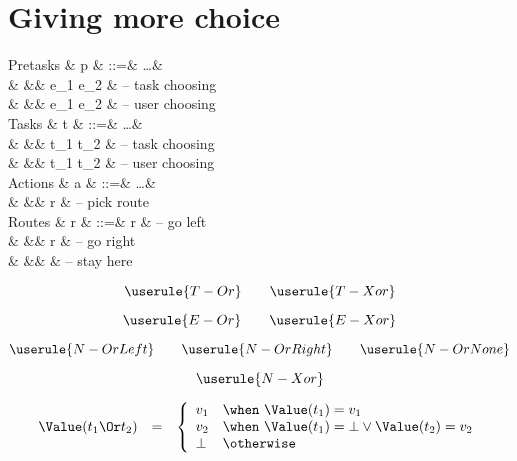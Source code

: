 
\section{Giving more choice}

\begin{grammar}
  Pretasks
    & p & ::=& \ldots       & \\
    &   &\mid& e_1 \Or e_2  & – task choosing \\
    &   &\mid& e_1 \Xor e_2 & – user choosing \\
  Tasks
    & t & ::=& \ldots       & \\
    &   &\mid& t_1 \Or t_2  & – task choosing \\
    &   &\mid& t_1 \Xor t_2 & – user choosing \\
  Actions
    & a & ::=& \ldots       & \\
    &   &\mid& \Pick r      & – pick route \\
  Routes
    & r & ::=& \Left r      & – go left \\
    &   &\mid& \Right r     & – go right \\
    &   &\mid& \Here        & – stay here \\
\end{grammar}

\begin{equation*}
  \userule{T-Or} \qquad \userule{T-Xor}
\end{equation*}

\begin{equation*}
  \userule{E-Or} \qquad \userule{E-Xor}
\end{equation*}

\begin{equation*}
  \userule{N-OrLeft} \qquad \userule{N-OrRight} \qquad \userule{N-OrNone}
\end{equation*}

\begin{equation*}
  \userule{N-Xor}
\end{equation*}

\begin{equation*}
  \begin{array}{lcl}
    \Value(t_1 \Or t_2) &=& \left\{
      \begin{array}{ll}
        v_1  & \when\ \Value(t_1) = v_1 \\
        v_2  & \when\ \Value(t_1) = \bot \lor \Value(t_2) = v_2 \\
        \bot & \otherwise
      \end{array}
    \right.
  \end{array}
\end{equation*}


